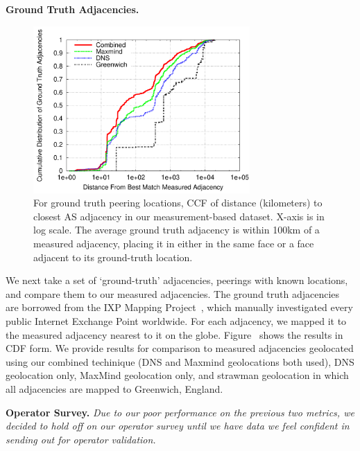     {\bf Ground Truth Adjacencies.}
\begin{figure}[tb]
\centering
\includegraphics[width=3.25in]{graph_all_match}
\caption[]{\label{fig:closestadjacency} For ground truth peering locations, CCF
of distance (kilometers) to closest AS adjacency in our measurement-based
dataset. X-axis is in log scale. The average ground truth adjacency is within
100km of a measured adjacency, placing it in either in the same face or a face
adjacent to its ground-truth location.} 
\end{figure}
    We next take a set of `ground-truth' adjacencies, peerings with known
    locations, and compare them to our measured adjacencies.  The ground truth
    adjacencies are borrowed from the IXP Mapping Project~\cite{ixps-mapped},
    which manually investigated every public Internet Exchange Point worldwide.
    For each adjacency, we mapped it to the measured adjacency nearest to it on
    the globe.  Figure~\cite{fig:closestadjacency} shows the results in CDF
    form.  We provide results for comparison to measured adjacencies geolocated
    using our combined techinique (DNS and Maxmind geolocations both used), DNS
    geolocation only, MaxMind geolocation only, and strawman geolocation in
    which all adjacencies are mapped to Greenwich, England.   




    {\bf Operator Survey.} {\it Due to our poor performance on the previous two
    metrics, we decided to hold off on our operator survey until we have data
    we feel confident in sending out for operator validation.}



